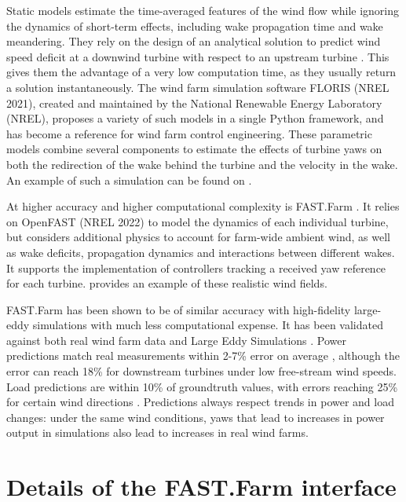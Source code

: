 \documentclass{article}
\begin{document}
Static models estimate the time-averaged features of the wind flow while ignoring the dynamics of short-term effects, including wake propagation time and wake meandering. They rely on the design of an analytical solution to predict wind speed deficit at a downwind turbine with respect to an upstream turbine  \cite{wake-models}. This gives them the advantage of a very low computation time, as they usually return a solution instantaneously. The wind farm simulation software FLORIS (NREL 2021), created and maintained by the National Renewable Energy Laboratory (NREL), proposes a variety of such models in a single Python framework, and has become a reference for wind farm control engineering. These parametric models combine several components to estimate the effects of turbine yaws on both the redirection of the wake behind the turbine and the velocity in the wake. An example of such a simulation can be found on . 

At higher accuracy and higher computational complexity is FAST.Farm \cite{fast.farm}. It relies on OpenFAST (NREL 2022) to model the dynamics of each individual turbine, but considers additional physics to account for farm-wide ambient wind, as well as wake deficits, propagation dynamics and interactions between different wakes. It supports the implementation of controllers tracking a received yaw reference for each turbine.  provides an example of these realistic wind fields. 

FAST.Farm has been shown to be of similar accuracy with high-fidelity large-eddy simulations with much less computational expense. It has been validated against both real wind farm data \cite{shaler2020validation,kretschmer2021fast} and Large Eddy Simulations \cite{fast.farm-validation,shaler2021fast}. Power predictions match real measurements within 2-7\% error on average \cite{shaler2020validation}, although the error can reach 18\% for downstream turbines under low free-stream wind speeds. Load predictions are within 10\% of groundtruth values, with errors reaching 25\% for certain wind directions \cite{shaler2021fast}. Predictions always respect trends in power and load changes: under the same wind conditions, yaws that lead to increases in power output in simulations also lead to increases in real wind farms.

\newpage

\section{Details of the FAST.Farm interface} \label{appendix:interface}
\end{document}
